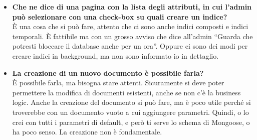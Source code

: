 \begin{itemize}
		\item
		{\bfseries Che ne dice di una pagina con la lista degli attributi, in cui l'admin può selezionare con una check-box su quali creare un indice?} \\
		È una cosa che si può fare, attento che ci sono anche indici composti e indici temporali. È fattibile ma con un grosso avviso che dice all'admin ``Guarda che potresti bloccare il database anche per un ora''. Oppure ci sono dei modi per creare indici in background, ma non sono informato io in dettaglio.
		
		\item
		{\bfseries La creazione di un nuovo documento è possibile farla?} \\
		È possibile farla, ma bisogna stare attenti. Sicuramente si deve poter permettere la modifica di documenti esistenti, anche se non c'è la business logic. Anche la creazione del documento si può fare, ma è poco utile perché si troverebbe con un documento vuoto a cui aggiungere parametri. Quindi, o lo crei con tutti i parametri di default, e però ti serve lo schema di Mongoose, o ha poco senso. La creazione non è fondamentale.
		
	\end{itemize}
